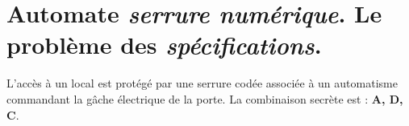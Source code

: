 \documentclass[a4paper,11pt]{article}
\newif\ifsolutions
\begin{document}
\ifsolutions
\begin{solbox}

\subsection*{Question 1 : Définition des états}

\textbf{États possibles (somme encaissée) :}
\begin{itemize}
    \item `S0` : 0,00€ (état initial)
    \item `S50` : 0,50€
    \item `S100` : 1,00€ (on distribue puis on revient à S0)
    \item `S150` : 1,50€ (on distribue, on rend 0,50€, puis on revient à S0)
\end{itemize}

Voici l'ensemble des équations pour les entrées des 4 bascules :

\[
\begin{array}{rcl}
D_0 & = & Q_2 \; + \; Q_3 \quad \text{(retour à zéro après distribution)} \\
D_1 & = & Q_0 \cdot P50 \\
D_2 & = & Q_0 \cdot P100 \; + \; Q_1 \cdot P50 \\
D_3 & = & Q_1 \cdot P100 \; + \; Q_2 \cdot P50
\end{array}
\]

\noindent \textbf{Remarque :} En codage binaire classique, ces équations auraient nécessité des décodeurs complexes. Ici, la logique se limite à des portes ET et OU, ce qui rend la machine plus rapide et plus facile à maintenir.

\end{solbox}
\fi

\section{Automate \textit{serrure numérique}. Le problème des \textit{spécifications}.}

L'accès à un local est protégé par une serrure codée associée à un automatisme commandant la gâche électrique de la porte. La combinaison secrète est : \textbf{A, D, C}.
\end{document}
